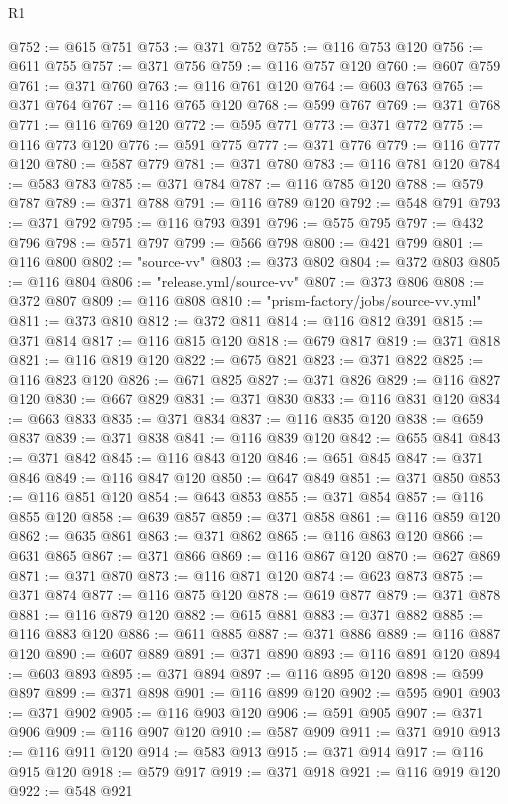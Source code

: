 \begin{lexlean}{R1}
\begin{coremodule}
@752 := @615 @751
@753 := @371 @752
@755 := @116 @753 @120
@756 := @611 @755
@757 := @371 @756
@759 := @116 @757 @120
@760 := @607 @759
@761 := @371 @760
@763 := @116 @761 @120
@764 := @603 @763
@765 := @371 @764
@767 := @116 @765 @120
@768 := @599 @767
@769 := @371 @768
@771 := @116 @769 @120
@772 := @595 @771
@773 := @371 @772
@775 := @116 @773 @120
@776 := @591 @775
@777 := @371 @776
@779 := @116 @777 @120
@780 := @587 @779
@781 := @371 @780
@783 := @116 @781 @120
@784 := @583 @783
@785 := @371 @784
@787 := @116 @785 @120
@788 := @579 @787
@789 := @371 @788
@791 := @116 @789 @120
@792 := @548 @791
@793 := @371 @792
@795 := @116 @793 @391
@796 := @575 @795
@797 := @432 @796
@798 := @571 @797
@799 := @566 @798
@800 := @421 @799
@801 := @116 @800
@802 := "source-vv"
@803 := @373 @802
@804 := @372 @803
@805 := @116 @804
@806 := "release.yml/source-vv"
@807 := @373 @806
@808 := @372 @807
@809 := @116 @808
@810 := "prism-factory/jobs/source-vv.yml"
@811 := @373 @810
@812 := @372 @811
@814 := @116 @812 @391
@815 := @371 @814
@817 := @116 @815 @120
@818 := @679 @817
@819 := @371 @818
@821 := @116 @819 @120
@822 := @675 @821
@823 := @371 @822
@825 := @116 @823 @120
@826 := @671 @825
@827 := @371 @826
@829 := @116 @827 @120
@830 := @667 @829
@831 := @371 @830
@833 := @116 @831 @120
@834 := @663 @833
@835 := @371 @834
@837 := @116 @835 @120
@838 := @659 @837
@839 := @371 @838
@841 := @116 @839 @120
@842 := @655 @841
@843 := @371 @842
@845 := @116 @843 @120
@846 := @651 @845
@847 := @371 @846
@849 := @116 @847 @120
@850 := @647 @849
@851 := @371 @850
@853 := @116 @851 @120
@854 := @643 @853
@855 := @371 @854
@857 := @116 @855 @120
@858 := @639 @857
@859 := @371 @858
@861 := @116 @859 @120
@862 := @635 @861
@863 := @371 @862
@865 := @116 @863 @120
@866 := @631 @865
@867 := @371 @866
@869 := @116 @867 @120
@870 := @627 @869
@871 := @371 @870
@873 := @116 @871 @120
@874 := @623 @873
@875 := @371 @874
@877 := @116 @875 @120
@878 := @619 @877
@879 := @371 @878
@881 := @116 @879 @120
@882 := @615 @881
@883 := @371 @882
@885 := @116 @883 @120
@886 := @611 @885
@887 := @371 @886
@889 := @116 @887 @120
@890 := @607 @889
@891 := @371 @890
@893 := @116 @891 @120
@894 := @603 @893
@895 := @371 @894
@897 := @116 @895 @120
@898 := @599 @897
@899 := @371 @898
@901 := @116 @899 @120
@902 := @595 @901
@903 := @371 @902
@905 := @116 @903 @120
@906 := @591 @905
@907 := @371 @906
@909 := @116 @907 @120
@910 := @587 @909
@911 := @371 @910
@913 := @116 @911 @120
@914 := @583 @913
@915 := @371 @914
@917 := @116 @915 @120
@918 := @579 @917
@919 := @371 @918
@921 := @116 @919 @120
@922 := @548 @921

\end{coremodule}
\end{lexlean}
